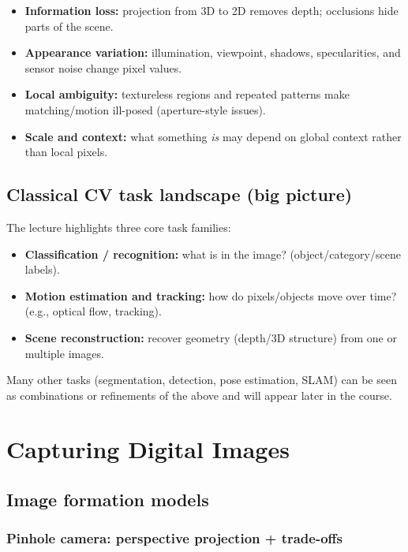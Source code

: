 \documentclass[11pt,a4paper]{article}
\begin{document}
\begin{itemize}
  \item \textbf{Information loss:} projection from 3D to 2D removes depth; occlusions hide parts of the scene.
  \item \textbf{Appearance variation:} illumination, viewpoint, shadows, specularities, and sensor noise change pixel values.
  \item \textbf{Local ambiguity:} textureless regions and repeated patterns make matching/motion ill-posed (aperture-style issues).
  \item \textbf{Scale and context:} what something \emph{is} may depend on global context rather than local pixels.
\end{itemize}

\subsection{Classical CV task landscape (big picture)}

The lecture highlights three core task families:
\begin{itemize}
  \item \textbf{Classification / recognition:} what is in the image? (object/category/scene labels).
  \item \textbf{Motion estimation and tracking:} how do pixels/objects move over time? (e.g., optical flow, tracking).
  \item \textbf{Scene reconstruction:} recover geometry (depth/3D structure) from one or multiple images.
\end{itemize}

\begin{notebox}
Many other tasks (segmentation, detection, pose estimation, SLAM) can be seen as combinations or refinements of the above
and will appear later in the course.
\end{notebox}

\section{Capturing Digital Images}

\subsection{Image formation models}

\subsubsection{Pinhole camera: perspective projection + trade-offs}
\end{document}
